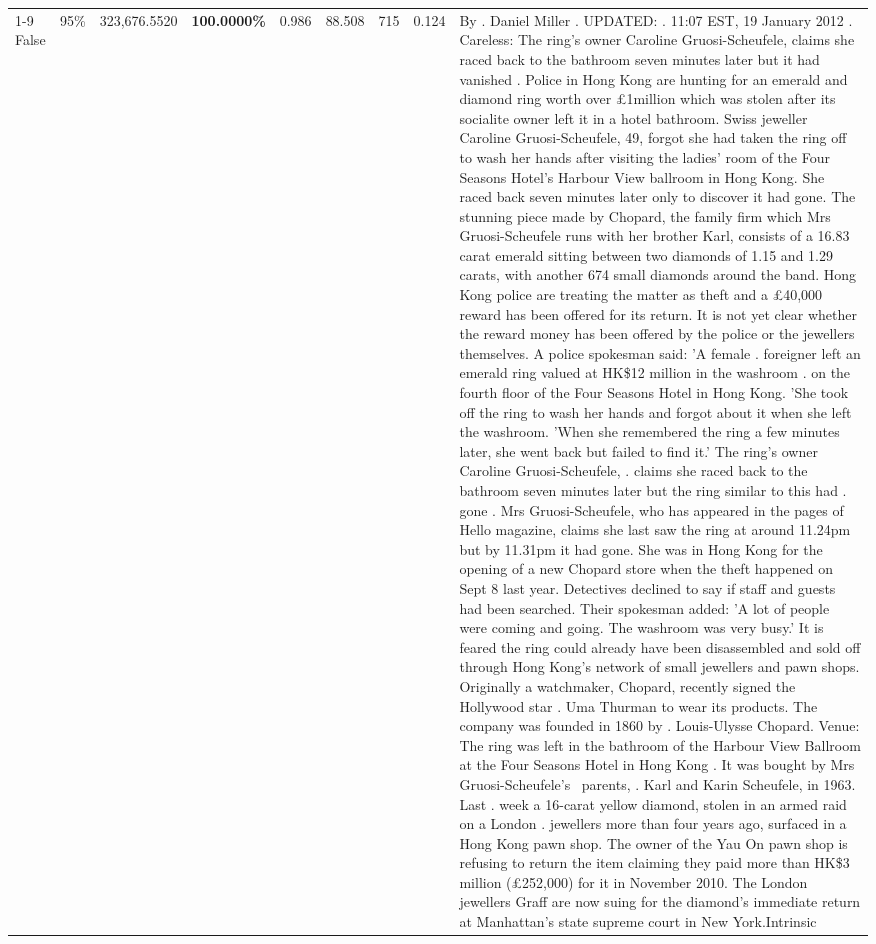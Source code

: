 \begin{table}[H]
\begin{tabular}{lllrlllll}
\cline{1-9} \cline{2-9}
False & 95\% & 323,676.5520 & \bfseries \color{red} 100.0000\% & 0.986 & 88.508 & 715 & 0.124 & By . Daniel Miller . UPDATED: . 11:07 EST, 19 January 2012 . Careless: The ring's owner Caroline Gruosi-Scheufele, claims she raced back to the bathroom seven minutes later but it had vanished . Police in Hong Kong are hunting for an emerald and diamond ring worth over £1million which was stolen after its socialite owner left it in a hotel bathroom. Swiss jeweller Caroline Gruosi-Scheufele, 49, forgot she had taken the ring off to wash her hands after visiting the ladies' room of the Four Seasons Hotel's Harbour View ballroom in Hong Kong. She raced back seven minutes later only to discover it had gone. The stunning piece made by Chopard, the family firm which Mrs Gruosi-Scheufele runs with her brother Karl, consists of a 16.83 carat emerald sitting between two diamonds of 1.15 and 1.29 carats, with another 674 small diamonds around the band. Hong Kong police are treating the matter as theft and a £40,000 reward has been offered for its return. It is not yet clear whether the reward money has been offered by the police or the jewellers themselves. A police spokesman said: 'A female . foreigner left an emerald ring valued at HK\$12 million in the washroom . on the fourth floor of the Four Seasons Hotel in Hong Kong. 'She took off the ring to wash her hands and forgot about it when she left the washroom. 'When she remembered the ring a few minutes later, she went back but failed to find it.' The ring's owner Caroline Gruosi-Scheufele, . claims she raced back to the bathroom seven minutes later but the ring similar to this had . gone . Mrs Gruosi-Scheufele, who has appeared in the pages of Hello magazine, claims she last saw the ring at around 11.24pm but by 11.31pm it had gone. She was in Hong Kong for the opening of a new Chopard store when the theft happened on Sept 8 last year. Detectives declined to say if staff and guests had been searched. Their spokesman added: 'A lot of people were coming and going. The washroom was very busy.' It is feared the ring could already have been disassembled and sold off through Hong Kong's network of small jewellers and pawn shops. Originally a watchmaker, Chopard, recently signed the Hollywood star . Uma Thurman to wear its products. The company was founded in 1860 by . Louis-Ulysse Chopard. Venue: The ring was left in the bathroom of the Harbour View Ballroom at the Four Seasons Hotel in Hong Kong . It was bought by Mrs Gruosi-Scheufele's  parents, . Karl and Karin Scheufele, in 1963. Last . week a 16-carat yellow diamond, stolen in an armed raid on a London . jewellers more than four years ago, surfaced in a Hong Kong pawn shop. The owner of the Yau On pawn shop is refusing to return the item claiming they paid more than HK\$3 million (£252,000) for it in November 2010. The London jewellers Graff are now suing for the diamond’s immediate return at Manhattan’s state supreme court in New York.Intrinsic \\

\end{tabular}
\end{table}
